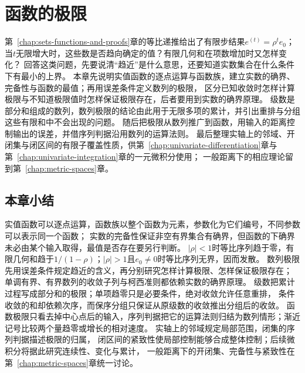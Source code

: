 \chapter{函数的极限}
\label{chap:function-limits}
\label{chap:mathematical-analysis}

第~\ref{chap:sets-functions-and-proofs}章的等比递推给出了有限步结果$e^{(t)}=\rho^te_0$；
当$t$无限增大时，这些数是否趋向确定的值？有限几何和在项数增加时又怎样变化？
回答这类问题，先要说清“趋近”是什么意思，还要知道实数集合在什么条件下有最小的上界。
本章先说明实值函数的逐点运算与函数族，建立实数的确界、完备性与函数的最值；再用误差条件定义数列的极限，
区分已知收敛时怎样计算极限与不知道极限值时怎样保证极限存在，后者要用到实数的确界原理。
级数是部分和组成的数列，数列极限的结论由此用于无限多项的累计，并引出重排与分组这些有限和中不会出现的问题。
随后把极限从数列推广到函数，用输入的距离控制输出的误差，并借序列判据沿用数列的运算法则。
最后整理实轴上的邻域、开闭集与闭区间的有限子覆盖性质，供第~\ref{chap:univariate-differentiation}章与第~\ref{chap:univariate-integration}章的一元微积分使用；
一般距离下的相应理论留到第~\ref{chap:metric-spaces}章。





\FloatBarrier
\section{本章小结}
\label{sec:function-limits-summary}

实值函数可以逐点运算，函数族以整个函数为元素，参数化为它们编号，不同参数可以表示同一个函数；
实数的完备性保证非空有界集合有确界，但函数的下确界未必由某个输入取得，最值是否存在要另行判断。
$|\rho|<1$时等比序列趋于零，有限几何和趋于$1/(1-\rho)$；$|\rho|>1$且$e_0\neq0$时等比序列无界，因而发散。
数列极限先用误差条件规定趋近的含义，再分别研究怎样计算极限、怎样保证极限存在；
单调有界、有界数列的收敛子列与柯西准则都依赖实数的确界原理。
级数把累计过程写成部分和的极限；单项趋零只是必要条件，绝对收敛允许任意重排，
条件收敛的和却依赖次序，而保序分组只保证从原级数的收敛推出分组后的收敛。
函数极限只看去掉中心点后的输入，序列判据把它的运算法则归结为数列情形；渐近记号比较两个量趋零或增长的相对速度。
实轴上的邻域规定局部范围，闭集的序列判据描述极限的归属，
闭区间的紧致性使局部控制能够合成整体控制；后续微积分将据此研究连续性、变化与累计，
一般距离下的开闭集、完备性与紧致性在第~\ref{chap:metric-spaces}章统一讨论。
